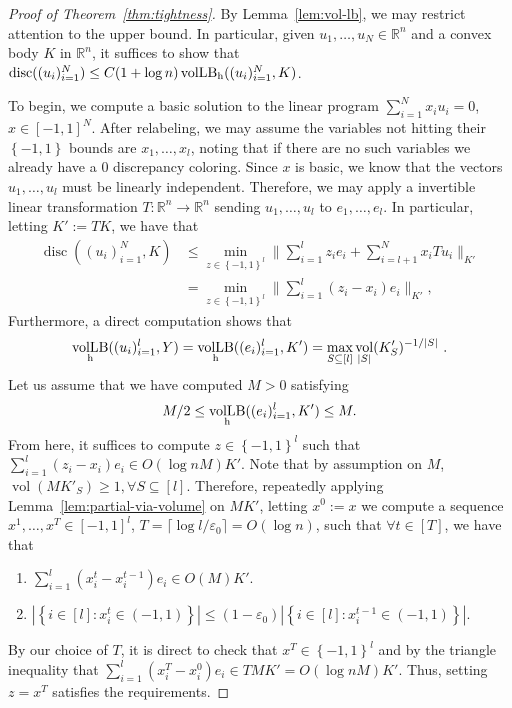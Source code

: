 \documentclass[12pt]{article}
\newcommand{\R}{{\mathbb{R}}}
\newcommand\eps{\varepsilon}
\newcommand{\set}[1]{\left\{ #1 \right\}}
\DeclareMathOperator{\vollb}{volLB}
\DeclareMathOperator{\disc}{disc}
\DeclareMathOperator{\vol}{vol}
\begin{document}
\begin{proof}[Proof of Theorem~\ref{thm:tightness}]
By Lemma~\ref{lem:vol-lb}, we may restrict attention to the upper bound. In
particular, given $u_1,\dots,u_N \in \R^n$ and a convex body $K$ in $\R^n$, it
suffices to show that $\disc((u_i)_{i=1}^N) \leq C(1+\log n)\vollb_{\rm
h}((u_i)_{i=1}^N,K)$.  

To begin, we compute a basic solution to the linear program $\sum_{i=1}^N x_i
u_i = 0$, $x \in [-1,1]^N$. After relabeling, we may assume the variables not
hitting their $\set{-1,1}$ bounds are $x_1,\dots,x_l$, noting that if there are
no such variables we already have a $0$ discrepancy coloring. Since
$x$ is basic, we know that the vectors $u_1,\dots,u_l$ must be linearly
independent. Therefore, we may apply a invertible linear
transformation $T:\R^n \rightarrow \R^n$ sending $u_1,\dots,u_l$ to
$e_1,\dots,e_l$. In particular, letting $K' := TK$, we have that 
\begin{align*}
\disc((u_i)_{i=1}^N,K) &\leq \min_{z \in \set{-1,1}^l} \|\sum_{i=1}^l z_i e_i +
\sum_{i=l+1}^N x_i T u_i\|_{K'} \\
                &= \min_{z \in \set{-1,1}^l} \|\sum_{i=1}^l (z_i-x_i)e_i\|_{K'}, 
\end{align*}
Furthermore, a direct computation shows that
\[
\vollb_{\rm h}((u_i)_{i=1}^l,Y) = \vollb_{\rm h}((e_i)_{i=1}^l,K') = \max_{S \subseteq [l]}
\vol_{|S|}(K'_S)^{-1/|S|} \text{ .}
\] 
Let us assume that we have computed $M > 0$ satisfying 
\[
M/2 \leq \vollb_{\rm h}((e_i)_{i=1}^l,K') \leq M. 
\]
From here, it suffices to compute $z \in
\set{-1,1}^l$ such that $\sum_{i=1}^l (z_i-x_i) e_i \in O(\log n M) K'$. Note
that by assumption on $M$, $\vol(MK'_S) \geq 1, \forall S \subseteq [l]$.
Therefore, repeatedly applying Lemma~\ref{lem:partial-via-volume} on $MK'$, letting $x^0 := x$ we compute a sequence
$x^1,\dots,x^T \in [-1,1]^l$, $T = \lceil \log l/\eps_0
\rceil = O(\log n)$, such that $\forall t \in [T]$, we have that

\begin{enumerate}
\item $\sum_{i=1}^l (x^t_i-x^{t-1}_i)e_i \in O(M) K'$.
\item $|\set{i \in [l]: x^t_i \in (-1,1)}| \leq (1-\eps_0)|\set{i \in [l]:
x^{t-1}_i \in (-1,1)}|$.
\end{enumerate}

By our choice of $T$, it is direct to check that $x^T \in \set{-1,1}^l$ and by
the triangle inequality that $\sum_{i=1}^l (x^T_i-x^0_i)e_i \in T M K' = O(\log n
M) K'$. Thus, setting $z = x^T$ satisfies the requirements.


\end{proof}
\end{document}
